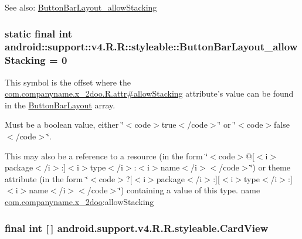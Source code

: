 \begin{Desc}
\item[See also:]\hyperlink{classandroid_1_1support_1_1v4_1_1_r_1_1styleable_dfe9fca963c8e4366d8e5dedf151f185}{ButtonBarLayout\_\-allowStacking} \end{Desc}
\hypertarget{classandroid_1_1support_1_1v4_1_1_r_1_1styleable_dfe9fca963c8e4366d8e5dedf151f185}{
\subsubsection[{ButtonBarLayout\_\-allowStacking}]{\setlength{\rightskip}{0pt plus 5cm}static final int android::support::v4.R.R::styleable::ButtonBarLayout\_\-allowStacking = 0}}
\label{classandroid_1_1support_1_1v4_1_1_r_1_1styleable_dfe9fca963c8e4366d8e5dedf151f185}


This symbol is the offset where the \hyperlink{classcom_1_1companyname_1_1x__2doo_1_1_r_1_1attr_ee469da1af224422e3d73b580484b9b8}{com.companyname.x\_\-2doo.R.attr\#allowStacking} attribute's value can be found in the \hyperlink{classandroid_1_1support_1_1v4_1_1_r_1_1styleable_89ab1bc4e8f12a7cf690670f5c8f2e54}{ButtonBarLayout} array.

Must be a boolean value, either \char`\"{}$<$code$>$true$<$/code$>$\char`\"{} or \char`\"{}$<$code$>$false$<$/code$>$\char`\"{}. 

This may also be a reference to a resource (in the form \char`\"{}$<$code$>$@\mbox{[}$<$i$>$package$<$/i$>$:\mbox{]}$<$i$>$type$<$/i$>$:$<$i$>$name$<$/i$>$$<$/code$>$\char`\"{}) or theme attribute (in the form \char`\"{}$<$code$>$?\mbox{[}$<$i$>$package$<$/i$>$:\mbox{]}\mbox{[}$<$i$>$type$<$/i$>$:\mbox{]}$<$i$>$name$<$/i$>$$<$/code$>$\char`\"{}) containing a value of this type.  name \hyperlink{namespacecom_1_1companyname_1_1x__2doo}{com.companyname.x\_\-2doo}:allowStacking \hypertarget{classandroid_1_1support_1_1v4_1_1_r_1_1styleable_4fcc6453aa91deadd7072add3aee5e56}{
\subsubsection[{CardView}]{\setlength{\rightskip}{0pt plus 5cm}final int \mbox{[}$\,$\mbox{]} android.support.v4.R.R.styleable.CardView}}
\label{classandroid_1_1support_1_1v4_1_1_r_1_1styleable_4fcc6453aa91deadd7072add3aee5e56}


